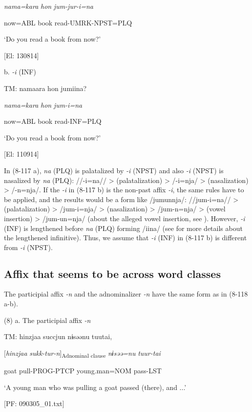       \textit{nama=kara}  \textit{hon}  \textit{jum-jur-i=na}

      now=ABL  book  read-UMRK-NPST=PLQ

      ‘Do you read a book from now?’

      [El: 130814]

  b.  \textit{{}-i} (INF)

    TM:  namaara  hon  jumiina?

      \textit{nama=kara}  \textit{hon}  \textit{jum-i=na}

      now=ABL  book  read-INF=PLQ

      ‘Do you read a book from now?’

      [El: 110914]

In (8-117 a), \textit{na} (PLQ) is palatalized by \textit{{}-i} (NPST) and also \textit{{}-i} (NPST) is nasalized by \textit{na} (PLQ): //-i=na// > (palatalization) > /-i=nja/ > (nasalization) > /-n=nja/. If the \textit{{}-i} in (8-117 b) is the non-past affix \textit{{}-i}, the same rules have to be applied, and the results would be a form like /jumunnja/: //jum-i=na// > (palatalization) > /jum-i=nja/ > (nasalization) > /jum-n=nja/ > (vowel insertion) > /jum-un=nja/ (about the alleged vowel insertion, see ). However, \textit{{}-i} (INF) is lengthened before \textit{na} (PLQ) forming /iina/ (see  for more details about the lengthened infinitive). Thus, we assume that \textit{{}-i} (INF) in (8-117 b) is different from \textit{{}-i} (NPST).

\subsection{Affix that seems to be across word classes}

The participial affix \textit{{}-n} and the adnominalizer \textit{{}-n} have the same form as in (8-118 a-b).

(8)  a. The participial affix \textit{{}-n}

  TM:   hinzjaa  succjun  nɨsəənu  tuutai,

    [\textit{hinzjaa}  \textit{sukk-tur-n}]\textsubscript{Adnominal clause}  \textit{nɨsəə=nu}  \textit{tuur-tai}

    goat  pull-PROG-PTCP  young.man=NOM  pass-LST

    ‘A young man who was pulling a goat passed (there), and ...’

  [PF: 090305\_01.txt]

